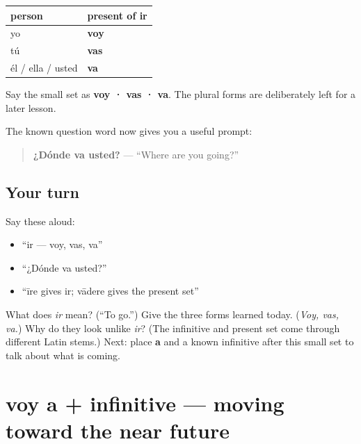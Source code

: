 \begin{grammarlens}[title={Grammar Lens: only three forms today}]
\noindent
\begin{tabularx}{\linewidth}{@{}>{\raggedright\arraybackslash}X>{\raggedright\arraybackslash}X@{}}
\toprule
\textbf{person} & \textbf{present of \textbf{ir}} \\
\midrule
yo & \textbf{voy} \\
tú & \textbf{vas} \\
él / ella / usted & \textbf{va} \\
\bottomrule
\end{tabularx}

Say the small set as \textbf{voy · vas · va}. The plural forms are deliberately left for a later lesson.

The known question word now gives you a useful prompt:

\begin{quote}
\textbf{¿Dónde va usted?} — “Where are you going?”
\end{quote}
\end{grammarlens}

\subsection*{Your turn}
Say these aloud:

\begin{itemize}
\raggedright
  \item “ir — voy, vas, va”
  \item “¿Dónde va usted?”
  \item “īre gives ir; vādere gives the present set”
\end{itemize}

\begin{tcolorbox}[breakable,colback=teal!4,colframe=teal!35!black,title={Before you move on}]
What does \emph{ir} mean? (“To go.”) Give the three forms learned today. (\emph{Voy, vas, va.}) Why do they look unlike \emph{ir}? (The infinitive and present set come through different Latin stems.) Next: place \textbf{a} and a known infinitive after this small set to talk about what is coming.
\end{tcolorbox}
\section[voy a + infinitive]{voy a + infinitive — moving toward the near future}

\label{lesson:ES-C10-ir-a-futuro}



